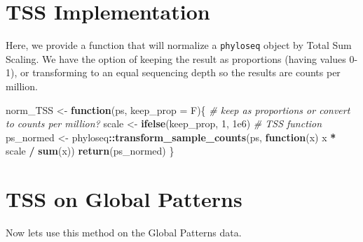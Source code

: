 \documentclass[
]{book}
\newenvironment{Shaded}{\begin{snugshade}}{\end{snugshade}}
\newcommand{\CommentTok}[1]{\textcolor[rgb]{0.56,0.35,0.01}{\textit{#1}}}
\newcommand{\ControlFlowTok}[1]{\textcolor[rgb]{0.13,0.29,0.53}{\textbf{#1}}}
\newcommand{\DataTypeTok}[1]{\textcolor[rgb]{0.13,0.29,0.53}{#1}}
\newcommand{\DecValTok}[1]{\textcolor[rgb]{0.00,0.00,0.81}{#1}}
\newcommand{\FloatTok}[1]{\textcolor[rgb]{0.00,0.00,0.81}{#1}}
\newcommand{\KeywordTok}[1]{\textcolor[rgb]{0.13,0.29,0.53}{\textbf{#1}}}
\newcommand{\NormalTok}[1]{#1}
\newcommand{\OperatorTok}[1]{\textcolor[rgb]{0.81,0.36,0.00}{\textbf{#1}}}
\newcommand{\StringTok}[1]{\textcolor[rgb]{0.31,0.60,0.02}{#1}}
\begin{document}
\hypertarget{tss-implementation}{%
\section{TSS Implementation}\label{tss-implementation}}

Here, we provide a function that will normalize a \texttt{phyloseq} object by Total Sum Scaling. We have the option of keeping the result as proportions (having values 0-1), or transforming to an equal sequencing depth so the results are counts per million.

\begin{Shaded}
\begin{Highlighting}[]
\NormalTok{norm\_TSS \textless{}{-}}\StringTok{ }\ControlFlowTok{function}\NormalTok{(ps, }\DataTypeTok{keep\_prop =}\NormalTok{ F)\{}
    \CommentTok{\# keep as proportions or convert to counts per million?}
\NormalTok{    scale \textless{}{-}}\StringTok{ }\KeywordTok{ifelse}\NormalTok{(keep\_prop, }\DecValTok{1}\NormalTok{, }\FloatTok{1e6}\NormalTok{)}
    \CommentTok{\# TSS function}
\NormalTok{    ps\_normed \textless{}{-}}\StringTok{ }\NormalTok{phyloseq}\OperatorTok{::}\KeywordTok{transform\_sample\_counts}\NormalTok{(ps, }\ControlFlowTok{function}\NormalTok{(x) x }\OperatorTok{*}\StringTok{ }\NormalTok{scale }\OperatorTok{/}\StringTok{ }\KeywordTok{sum}\NormalTok{(x))}
    \KeywordTok{return}\NormalTok{(ps\_normed)}
\NormalTok{\}}
\end{Highlighting}
\end{Shaded}

\hypertarget{tss-on-global-patterns}{%
\section{TSS on Global Patterns}\label{tss-on-global-patterns}}

Now lets use this method on the Global Patterns data.

\begin{Shaded}
\end{Shaded}
\end{document}
